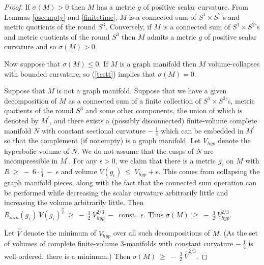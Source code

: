 \documentclass[12pt]{amsart}
\newcommand{\const}{\operatorname{const.}}
\numberwithin{equation}{section}
\theoremstyle{plain}
\theoremstyle{definition}
\theoremstyle{remark}
\begin{document}
\begin{proof}
If $\sigma(M) > 0$ then $M$ has a metric $g$ of positive scalar curvature.
From Lemmas \ref{pscempty} and \ref{finitetime}, $M$ is a connected sum of $S^1 \times S^2$'s and
metric quotients of the round $S^3$.
Conversely, if $M$ is a connected sum of $S^1 \times S^2$'s and
metric quotients of the round $S^3$ then $M$ admits a metric $g$ of
positive scalar curvature and so $\sigma(M) > 0$.

Now suppose that $\sigma(M) \le 0$.
If $M$ is a graph manifold then $M$ volume-collapses with bounded
curvature, so (\ref{testt}) implies that $\sigma(M) = 0$.

Suppose that $M$ is not a graph manifold. Suppose that we have
a given decomposition of $M$ 
as a connected sum
of a finite collection of $S^1 \times S^2$'s, metric quotients of the round
$S^3$ and some other components, the union of which is denoted by
$M^\prime$, and there exists a (possibly disconnected) finite-volume complete
manifold $N$ with constant sectional curvature $- \: \frac14$ 
which can be embedded in $M^\prime$ so that the
complement (if nonempty) is a graph manifold.
Let
$V_{hyp}$ denote the hyperbolic volume of $N$.  We do not
assume that the cusps of $N$ are incompressible in $M^\prime$.
For any $\epsilon > 0$, we claim that
there is a metric $g_\epsilon$ on $M$ with 
$R \: \ge \: - \: 6 \cdot \frac14 \: - \: \epsilon$ and volume
$V(g_\epsilon) \: \le \: V_{hyp} + \epsilon$. This comes from
collapsing the graph manifold pieces, along with the
fact that the connected sum operation can be performed
while  decreasing the scalar curvature arbitrarily little and increasing
the volume arbitrarily little.
Then
$R_{min}(g_\epsilon) \: V(g_\epsilon)^{\frac23}
 \: \ge \: - \: \frac32 \: V_{hyp}^{2/3} \: - \: \const \: 
\epsilon$. Thus
$\sigma(M) \: \ge \:
- \: \frac32 \: V_{hyp}^{2/3}$.

Let 
$\widehat{V}$
denote the minimum of $V_{hyp}$ over
all such decompositions of $M$. (As the set of
volumes of complete finite-volume $3$-manifolds with constant curvature
$- \: \frac14$ is well-ordered, there is a minimum.)
Then
$\sigma(M) \: \ge \:
- \: \frac32 \: \widehat{V}^{2/3}$.


\end{proof}
\end{document}
